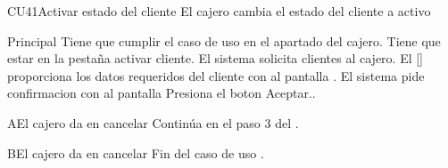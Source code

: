 \begin{UseCase}{CU41}{Activar estado del cliente}{
		El cajero cambia el estado del cliente a activo
	}
	\end{UseCase}
	\begin{UCtrayectoria}{Principal}
		\UCpaso[\UCactor] Tiene que cumplir el caso de uso  en el apartado del cajero.
		\UCpaso[\UCactor] Tiene que estar en la pestaña activar cliente.
		\UCpaso El sistema solicita clientes al cajero. 
		\UCpaso El [\UCactor] proporciona los datos requeridos del cliente con al pantalla .
		\UCpaso El sistema pide confirmacion con al pantalla 
		\UCpaso Presiona el boton Aceptar..
	\end{UCtrayectoria}

	\begin{UCtrayectoriaA}{A}{El cajero da en cancelar}
			\UCpaso Continúa en el paso 3 del .
		\end{UCtrayectoriaA}
		\begin{UCtrayectoriaA}{B}{El cajero da en cancelar}
			\UCpaso[] Fin del caso de uso .
		\end{UCtrayectoriaA}		
